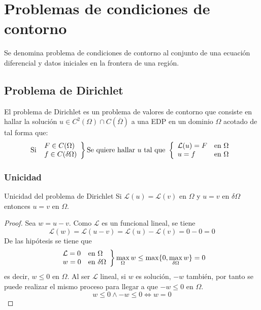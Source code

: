 \section{Problemas de condiciones de contorno}
Se denomina problema de condiciones de contorno al conjunto de una ecuación diferencial y datos iniciales en la frontera de una región.

\subsection{Problema de Dirichlet}
El problema de Dirichlet es un problema de valores de contorno que consiste en hallar la solución $u \in C^2(\Omega)\cap C(\overline{\Omega})$ a una EDP en un dominio $\Omega$ acotado de tal forma que:
\begin{equation*}
\text{Si }
\left.
\begin{array}{l}
F\in C(\Omega)\\
f\in C(\delta\Omega)
\end{array}
\right\}
\text{Se quiere hallar } u\text{ tal que }
\left\{
\begin{array}{l r}
\mathcal{L}(u) = F &\text{en } \Omega\\
u = f &\text{en } \Omega\\
\end{array}
\right.
\end{equation*}

\subsubsection{Unicidad}
\begin{prop}{Unicidad del problema de Dirichlet}
Si $\mathcal{L}(u)=\mathcal{L}(v)$ en $\Omega$ y $u=v$ en $\delta\Omega$ entonces $u = v$ en $\Omega$.
\end{prop}
\begin{proof}
Sea $w=u-v$. Como $\mathcal{L}$ es un funcional lineal, se tiene
$$\mathcal{L}(w) = \mathcal{L}(u-v) = \mathcal{L}(u)-\mathcal{L}(v) = 0-0 = 0$$
De las hipótesis se tiene que
\begin{equation*}
\left.
\begin{array}{l l}
\mathcal{L} = 0 & \text{en } \Omega\\
w = 0 & \text{en } \delta\Omega\\
\end{array}
\right\}
\max_{\Omega}w\le\max\{0,\max_{\delta\Omega}w\} = 0
\end{equation*}
es decir, $w\le0$ en $\Omega$. Al ser $\mathcal{L}$ lineal, si $w$ es solución, $-w$ también, por tanto se puede realizar el mismo proceso para llegar a que $-w\le0$ en $\Omega$.
$$w\le0 \wedge -w\le0 \iff w = 0$$
\end{proof}


